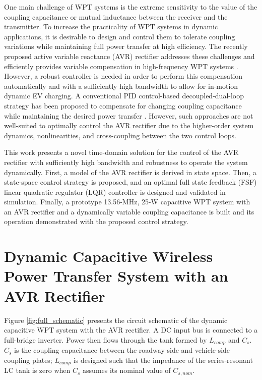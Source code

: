 \documentclass[conference, twocolumn, letterpaper]{IEEEtran}
\begin{document}
One main challenge of WPT systems is the extreme sensitivity to the value of the coupling capacitance or mutual inductance between the receiver and the transmitter. To increase the practicality of WPT systems in dynamic applications, it is desirable to design and control them to tolerate coupling variations while maintaining full power transfer at high efficiency. The recently proposed active variable reactance (AVR) rectifier addresses these challenges and efficiently provides variable compensation in high-frequency WPT systems \cite{2019_Sinha_Journal}. However, a robust controller is needed in order to perform this compensation automatically and with a sufficiently high bandwidth to allow for in-motion dynamic EV charging. A conventional PID control-based decoupled-dual-loop strategy has been proposed to compensate for changing coupling capacitance while maintaining the desired power transfer \cite{2019_Sinha_ECCE, 2024_Maji_COMPEL}. However, such approaches are not well-suited to optimally control the AVR rectifier due to the higher-order system dynamics, nonlinearities, and cross-coupling between the two control loops.

This work presents a novel time-domain solution for the control of the AVR rectifier with sufficiently high bandwidth and robustness to operate the system dynamically. First, a model of the AVR rectifier is derived in state space. Then, a state-space control strategy is proposed, and an optimal full state feedback (FSF) linear quadratic regulator (LQR) controller is designed and validated in simulation. Finally, a prototype 13.56-MHz, 25-W capacitive WPT system with an AVR rectifier and a dynamically variable coupling capacitance is built and its operation demonstrated with the proposed control strategy.

\vspace{0.5cm}

\section{Dynamic Capacitive Wireless Power Transfer System with an AVR Rectifier}
\label{sec:system}

Figure \ref{fig:full_schematic} presents the circuit schematic of the dynamic capacitive WPT system with the AVR rectifier. A DC input bus is connected to a full-bridge inverter. Power then flows through the tank formed by $L_{comp}$ and $C_s$. $C_s$ is the coupling capacitance between the roadway-side and vehicle-side coupling plates; $L_{comp}$ is designed such that the impedance of the series-resonant LC tank is zero when $C_s$ assumes its nominal value of $C_{s,nom}$.
\end{document}
